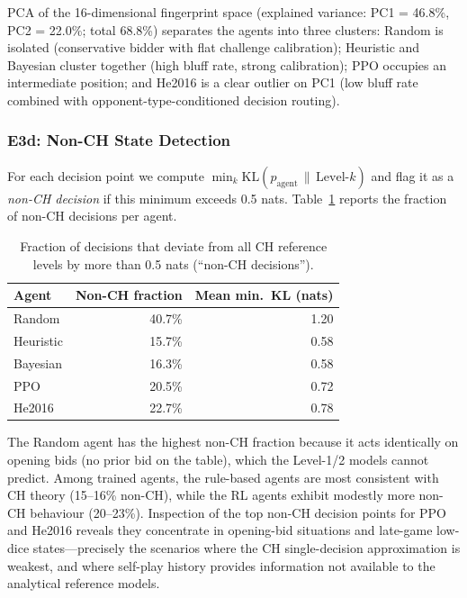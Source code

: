 \documentclass{article}
\begin{document}
PCA of the 16-dimensional fingerprint space (explained variance: PC1 = 46.8\%,
PC2 = 22.0\%; total 68.8\%) separates the agents into three clusters: Random is isolated
(conservative bidder with flat challenge calibration); Heuristic and Bayesian cluster together
(high bluff rate, strong calibration); PPO occupies an intermediate position; and He2016 is a
clear outlier on PC1 (low bluff rate combined with opponent-type-conditioned decision routing).

\subsubsection{E3d: Non-CH State Detection}

For each decision point we compute $\min_k \mathrm{KL}(p_{\text{agent}} \,\|\,
\mathrm{Level\text{-}}k)$ and flag it as a \emph{non-CH decision} if this minimum exceeds
0.5 nats.  Table~\ref{tab:rq3_nonch} reports the fraction of non-CH decisions per agent.

\begin{table}[h]
\centering
\caption{Fraction of decisions that deviate from all CH reference levels by more than 0.5 nats
(``non-CH decisions'').}
\label{tab:rq3_nonch}
\begin{tabular}{lrr}
\toprule
Agent & Non-CH fraction & Mean min.\ KL (nats) \\
\midrule
Random    & 40.7\% & 1.20 \\
Heuristic & 15.7\% & 0.58 \\
Bayesian  & 16.3\% & 0.58 \\
PPO       & 20.5\% & 0.72 \\
He2016    & 22.7\% & 0.78 \\
\bottomrule
\end{tabular}
\end{table}

The Random agent has the highest non-CH fraction because it acts identically on opening bids
(no prior bid on the table), which the Level-1/2 models cannot predict.  Among trained agents,
the rule-based agents are most consistent with CH theory (15--16\% non-CH), while the RL agents
exhibit modestly more non-CH behaviour (20--23\%).  Inspection of the top non-CH decision points
for PPO and He2016 reveals they concentrate in opening-bid situations and late-game low-dice
states---precisely the scenarios where the CH single-decision approximation is weakest, and
where self-play history provides information not available to the analytical reference models.
\end{document}
